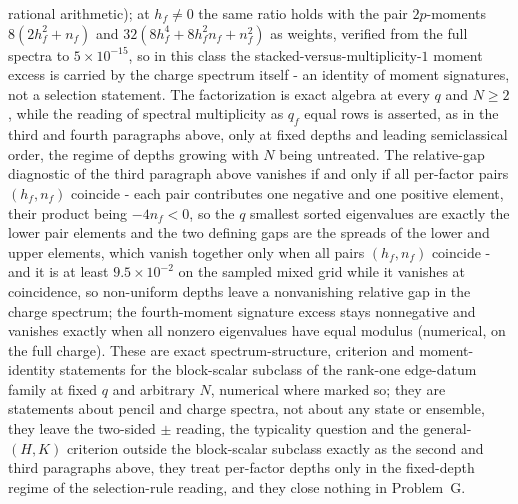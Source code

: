 rational arithmetic); at \(h_f\ne0\) the same ratio holds with the pair \(2p\)-moments \(8(2h_f^{2}+n_f)\) and \(32(8h_f^{4}+8h_f^{2}n_f+n_f^{2})\) as weights, verified from the full spectra to \(5\times10^{-15}\), so in this class the stacked-versus-multiplicity-\(1\) moment excess is carried by the charge spectrum itself - an identity of moment signatures, not a selection statement. The factorization is exact algebra at every \(q\) and \(N\ge2\), while the reading of spectral multiplicity as \(q_f\) equal rows is asserted, as in the third and fourth paragraphs above, only at fixed depths and leading semiclassical order, the regime of depths growing with \(N\) being untreated. The relative-gap diagnostic of the third paragraph above vanishes if and only if all per-factor pairs \((h_f,n_f)\) coincide - each pair contributes one negative and one positive element, their product being \(-4n_f<0\), so the \(q\) smallest sorted eigenvalues are exactly the lower pair elements and the two defining gaps are the spreads of the lower and upper elements, which vanish together only when all pairs \((h_f,n_f)\) coincide - and it is at least \(9.5\times10^{-2}\) on the sampled mixed grid while it vanishes at coincidence, so non-uniform depths leave a nonvanishing relative gap in the charge spectrum; the fourth-moment signature excess stays nonnegative and vanishes exactly when all nonzero eigenvalues have equal modulus (numerical, on the full charge). These are exact spectrum-structure, criterion and moment-identity statements for the block-scalar subclass of the rank-one edge-datum family at fixed \(q\) and arbitrary \(N\), numerical where marked so; they are statements about pencil and charge spectra, not about any state or ensemble, they leave the two-sided \(\pm\) reading, the typicality question and the general-\((H,K)\) criterion outside the block-scalar subclass exactly as the second and third paragraphs above, they treat per-factor depths only in the fixed-depth regime of the selection-rule reading, and they close nothing in Problem~G.
